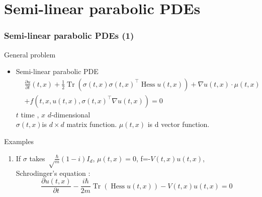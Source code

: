 \documentclass[mathserif,10pt]{beamer}
\DeclareMathOperator{\Hessian}{Hess}
\DeclareMathOperator{\Tr}{Tr}
\begin{document}
\section{Semi-linear parabolic PDEs}
\begin{frame}
\frametitle{Semi-linear parabolic PDEs (1)}
\begin{block}{General problem}
\begin{itemize}
\item Semi-linear parabolic PDE
\begin{align}
    &\frac{\partial u}{\partial t}(t,x)+\frac{1}{2} 
    \Tr(\sigma(t,x)\sigma(t,x)^\intercal
    \Hessian u(t,x))
    +\nabla u(t,x)\cdot \mu(t,x) \nonumber \\
	& +f(t,x,u(t,x),\sigma(t,x)^\intercal\nabla u(t,x))=0 \label{eq:01}
\end{align}
$t$ time , $x$  $d$-dimensional \\
$\sigma(t,x) $is $d\times d$  matrix function.
$\mu(t,x)$ is d vector function.
\end{itemize}
\end{block}
\begin{block}{Examples}
\begin{enumerate}
\item If $\sigma$ takes $\sqrt \frac{\hbar}{m}(1-i)I_d$,     $\mu(t,x)=0$,  f=-$V(t,x)u(t,x)$,\\Schrodinger's equation :
\begin{equation*}
    \frac{\partial u(t,x)}{\partial t}-\frac{i\hbar}{2m}
    \Tr(\Hessian u(t,x))-V(t,x)u(t,x)=0
\end{equation*}
\end{enumerate}
\end{block}
\end{frame}
\end{document}
